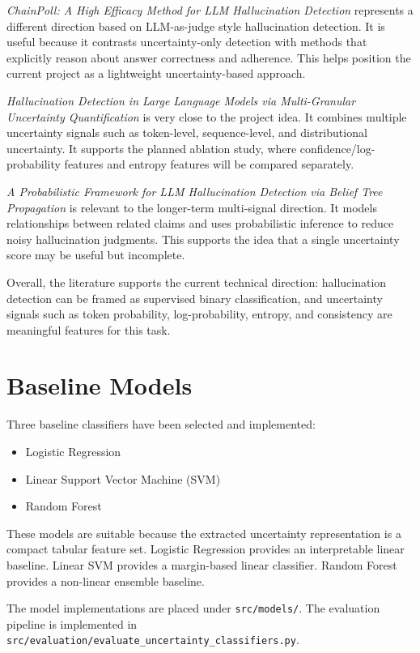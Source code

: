 \documentclass[11pt]{article}
\begin{document}
\textit{ChainPoll: A High Efficacy Method for LLM Hallucination Detection} represents a different direction based on LLM-as-judge style hallucination detection. It is useful because it contrasts uncertainty-only detection with methods that explicitly reason about answer correctness and adherence. This helps position the current project as a lightweight uncertainty-based approach.

\textit{Hallucination Detection in Large Language Models via Multi-Granular Uncertainty Quantification} is very close to the project idea. It combines multiple uncertainty signals such as token-level, sequence-level, and distributional uncertainty. It supports the planned ablation study, where confidence/log-probability features and entropy features will be compared separately.

\textit{A Probabilistic Framework for LLM Hallucination Detection via Belief Tree Propagation} is relevant to the longer-term multi-signal direction. It models relationships between related claims and uses probabilistic inference to reduce noisy hallucination judgments. This supports the idea that a single uncertainty score may be useful but incomplete.

Overall, the literature supports the current technical direction: hallucination detection can be framed as supervised binary classification, and uncertainty signals such as token probability, log-probability, entropy, and consistency are meaningful features for this task.

\section{Baseline Models}

Three baseline classifiers have been selected and implemented:

\begin{itemize}
    \item Logistic Regression
    \item Linear Support Vector Machine (SVM)
    \item Random Forest
\end{itemize}

These models are suitable because the extracted uncertainty representation is a compact tabular feature set. Logistic Regression provides an interpretable linear baseline. Linear SVM provides a margin-based linear classifier. Random Forest provides a non-linear ensemble baseline.

The model implementations are placed under \texttt{src/models/}. The evaluation pipeline is implemented in \texttt{src/evaluation/evaluate\_uncertainty\_classifiers.py}.
\end{document}

